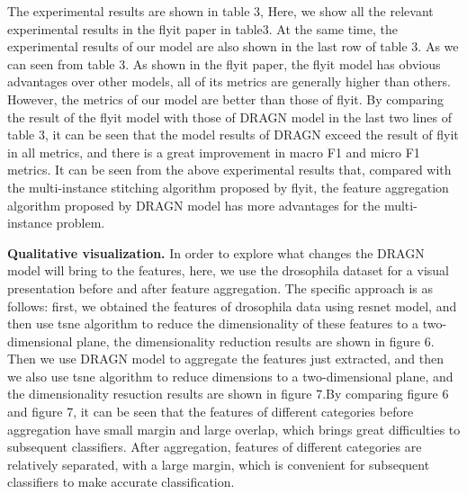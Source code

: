 \documentclass[10pt,twocolumn,letterpaper]{article}
\begin{document}
The experimental results are shown in table 3, Here, we show all the relevant experimental results in the flyit paper in table3. At the same time, the experimental results of our model are also shown in the last row of table 3. As we can seen from table 3. As shown in the flyit paper, the flyit model has obvious advantages over other models, all of its metrics are generally higher than others. However, the metrics of our model are better than those of flyit. By comparing the result of the flyit model with those of DRAGN model in the last two lines of table 3, it can be seen that the model results of DRAGN exceed the result of flyit in all metrics, and there is a great improvement in macro F1 and micro F1 metrics. It can be seen from the above experimental results that, compared with the multi-instance stitching algorithm proposed by flyit, the feature aggregation algorithm proposed by DRAGN model has more advantages for the multi-instance problem.

\textbf{Qualitative visualization.} In order to explore what changes the DRAGN model will bring to the features, here, we use the drosophila dataset for a visual presentation before and after feature aggregation. The specific approach is as follows: first, we obtained the features of drosophila data using resnet model, and then use tsne algorithm to reduce the dimensionality of these features to a two-dimensional plane, the dimensionality reduction results are shown in figure 6. Then we use DRAGN model to aggregate the features just extracted, and then we also use tsne algorithm to reduce dimensions to a two-dimensional plane, and the dimensionality resuction results are shown in figure 7.By comparing figure 6 and figure 7, it can be seen that the features of different categories before aggregation have small margin and large overlap, which brings great difficulties to subsequent classifiers. After aggregation, features of different categories are relatively separated, with a large margin, which is convenient for subsequent classifiers to make accurate classification.
\end{document}

